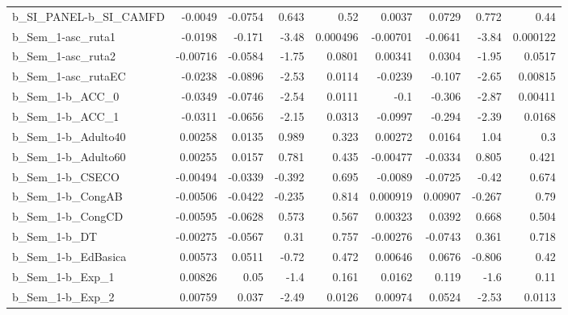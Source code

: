 \begin{tabular}{lrrrrrrrr}
b\_SI\_PANEL-b\_SI\_CAMFD      &     -0.0049 &      -0.0754 &     0.643 &     0.52 &     0.0037 &      0.0729 &        0.772 &          0.44 \\
b\_Sem\_1-asc\_ruta1          &     -0.0198 &       -0.171 &     -3.48 & 0.000496 &   -0.00701 &     -0.0641 &        -3.84 &      0.000122 \\
b\_Sem\_1-asc\_ruta2          &    -0.00716 &      -0.0584 &     -1.75 &   0.0801 &    0.00341 &      0.0304 &        -1.95 &        0.0517 \\
b\_Sem\_1-asc\_rutaEC         &     -0.0238 &      -0.0896 &     -2.53 &   0.0114 &    -0.0239 &      -0.107 &        -2.65 &       0.00815 \\
b\_Sem\_1-b\_ACC\_0            &     -0.0349 &      -0.0746 &     -2.54 &   0.0111 &       -0.1 &      -0.306 &        -2.87 &       0.00411 \\
b\_Sem\_1-b\_ACC\_1            &     -0.0311 &      -0.0656 &     -2.15 &   0.0313 &    -0.0997 &      -0.294 &        -2.39 &        0.0168 \\
b\_Sem\_1-b\_Adulto40         &     0.00258 &       0.0135 &     0.989 &    0.323 &    0.00272 &      0.0164 &         1.04 &           0.3 \\
b\_Sem\_1-b\_Adulto60         &     0.00255 &       0.0157 &     0.781 &    0.435 &   -0.00477 &     -0.0334 &        0.805 &         0.421 \\
b\_Sem\_1-b\_CSECO            &    -0.00494 &      -0.0339 &    -0.392 &    0.695 &    -0.0089 &     -0.0725 &        -0.42 &         0.674 \\
b\_Sem\_1-b\_CongAB           &    -0.00506 &      -0.0422 &    -0.235 &    0.814 &   0.000919 &     0.00907 &       -0.267 &          0.79 \\
b\_Sem\_1-b\_CongCD           &    -0.00595 &      -0.0628 &     0.573 &    0.567 &    0.00323 &      0.0392 &        0.668 &         0.504 \\
b\_Sem\_1-b\_DT               &    -0.00275 &      -0.0567 &      0.31 &    0.757 &   -0.00276 &     -0.0743 &        0.361 &         0.718 \\
b\_Sem\_1-b\_EdBasica         &     0.00573 &       0.0511 &     -0.72 &    0.472 &    0.00646 &      0.0676 &       -0.806 &          0.42 \\
b\_Sem\_1-b\_Exp\_1            &     0.00826 &         0.05 &      -1.4 &    0.161 &     0.0162 &       0.119 &         -1.6 &          0.11 \\
b\_Sem\_1-b\_Exp\_2            &     0.00759 &        0.037 &     -2.49 &   0.0126 &    0.00974 &      0.0524 &        -2.53 &        0.0113 \\

\end{tabular}
